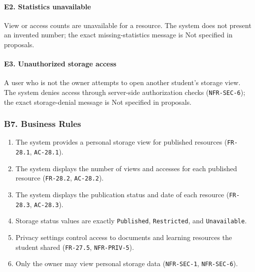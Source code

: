 \documentclass[12pt]{article}
\begin{document}
\hypertarget{sec:e2-statistics-unavailable}{}
\paragraph*{E2. Statistics unavailable}
\par\medskip

View or access counts are unavailable for a resource. The system does not present an invented number; the exact missing-statistics message is Not specified in proposals.
\par\medskip

\hypertarget{sec:e3-unauthorized-storage-access}{}
\paragraph*{E3. Unauthorized storage access}
\par\medskip

A user who is not the owner attempts to open another student's storage view. The system denies access through server-side authorization checks (\texttt{NFR-SEC-6}); the exact storage-denial message is Not specified in proposals.
\par\medskip

\hypertarget{sec:b7-business-rules}{}
\subsubsection*{B7. Business Rules}
\par\medskip

\begin{enumerate}
\item The system provides a personal storage view for published resources (\texttt{FR-28.1}, \texttt{AC-28.1}).
\item The system displays the number of views and accesses for each published resource (\texttt{FR-28.2}, \texttt{AC-28.2}).
\item The system displays the publication status and date of each resource (\texttt{FR-28.3}, \texttt{AC-28.3}).
\item Storage status values are exactly \texttt{Published}, \texttt{Restricted}, and \texttt{Unavailable}.
\item Privacy settings control access to documents and learning resources the student shared (\texttt{FR-27.5}, \texttt{NFR-PRIV-5}).
\item Only the owner may view personal storage data (\texttt{NFR-SEC-1}, \texttt{NFR-SEC-6}).
\end{enumerate}
\par\medskip
\end{document}
